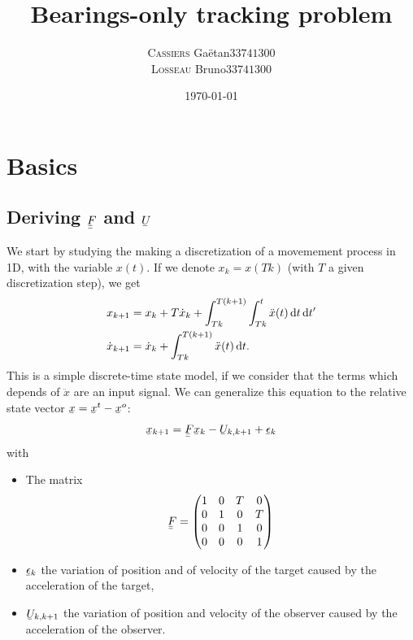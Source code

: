 \documentclass[english,DIV=13]{scrreprt}
\title{Bearings-only tracking problem}
\subtitle{}
\author{\begin{tabular}{cc}
	\textsc{Cassiers} Gaëtan  & 	$33741300$ \\
	\textsc{Losseau} Bruno 	&	$33741300$
	 \end{tabular}}
\date{\today}
\newcommand{\ubar}[1]{\underaccent{\bar}{#1}}
\newcommand{\uvec}[1]{\ubar{#1}}
\newcommand{\umatrix}[1]{\ubar{\ubar{#1}}}
\begin{document}
\maketitle


\tableofcontents


\chapter{Basics}
\section*{Deriving $\umatrix{F}$ and $\uvec{U}$}

We start by studying the making a discretization of a movemement process in 1D, with the
variable $x(t)$. If we denote $x_k = x(Tk)$ (with $T$ a given discretization step), we
get
\begin{align*}
    x_{k+1} &= x_k + T\dot{x}_k + \int_{Tk}^{T(k+1)}\int_{Tk}^{t}\ddot{x}(t)\operatorname{d}\! t\operatorname{d}\! t' \\
    \dot{x}_{k+1} &=  \dot{x}_k + \int_{Tk}^{T(k+1)}\ddot{x}(t)\operatorname{d}\! t.
\end{align*}
This is a simple discrete-time state model, if we consider that the terms which depends of $\ddot{x}$
are an input signal.
We can generalize this equation to the relative state vector $\uvec{x} = \uvec{x}^t - \uvec{x}^o$:
\[\uvec{x}_{k+1} = \umatrix{F}\uvec{x}_k - \uvec{U}_{k,k+1} + \uvec{\epsilon}_k\]
with
\begin{itemize}
    \item The matrix
        \[\umatrix{F} =
        \begin{pmatrix}
            1 & 0 & T & 0 \\
            0 & 1 & 0 & T \\   
            0 & 0 & 1 & 0 \\
            0 & 0 & 0 & 1   
        \end{pmatrix}
        \]
    \item $\uvec{\epsilon}_k$ the variation of position and of velocity of the target caused by the
acceleration of the target,
    \item $\uvec{U}_{k,k+1}$ the variation of position and velocity of
the observer caused by the acceleration of the observer.
\end{itemize}
\end{document}
